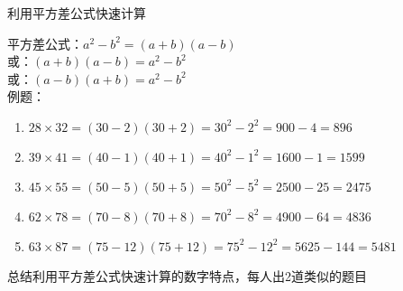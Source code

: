 \documentclass[aspectratio=169]{ctexbeamer} %
\date{\today}
\begin{document}
\begin{frame}[t]{利用平方差公式快速计算}
\begin{spacing}{1.2}
\normalsize
平方差公式：$a^2 - b^2 = (a+b)(a-b)$ \\
或：$(a+b)(a-b)=a^2 - b^2$ \\
或：$(a-b)(a+b)=a^2 - b^2$ \\
例题：
\begin{enumerate}[label={\arabic*.}]
\item $28 \times 32 = (30-2)(30+2)=30^2-2^2=900-4=896$
\item $39 \times 41 = (40-1)(40+1)=40^2-1^2=1600-1=1599$
\item $45 \times 55 = (50-5)(50+5)=50^2-5^2=2500-25=2475$
\item $62 \times 78 = (70-8)(70+8)=70^2-8^2=4900-64=4836$
\item $63 \times 87 = (75-12)(75+12)=75^2-12^2=5625-144=5481$
\end{enumerate}
\alert{总结利用平方差公式快速计算的数字特点，每人出2道类似的题目}
\end{spacing}
\end{frame}
\end{document}
